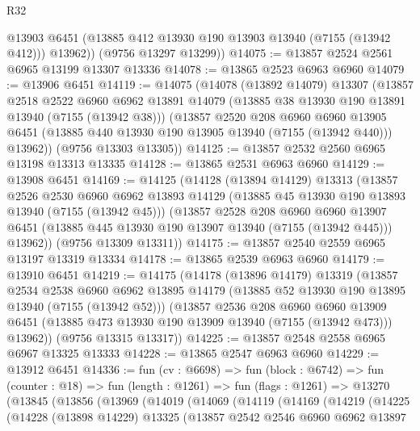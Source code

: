 \begin{lexlean}{R32}
\begin{coremodule}
          @13903
          @6451
          (@13885 @412 @13930 @190 @13903 @13940 (@7155 (@13942 @412)))
          @13962))
      (@9756 @13297 @13299))
@14075 := @13857 @2524 @2561 @6965 @13199 @13307 @13336
@14078 := @13865 @2523 @6963 @6960
@14079 := @13906 @6451
@14119 := @14075
    (@14078
      (@13892 @14079)
      @13307
      (@13857
        @2518
        @2522
        @6960
        @6962
        @13891
        @14079
        (@13885 @38 @13930 @190 @13891 @13940 (@7155 (@13942 @38)))
        (@13857
          @2520
          @208
          @6960
          @6960
          @13905
          @6451
          (@13885 @440 @13930 @190 @13905 @13940 (@7155 (@13942 @440)))
          @13962))
      (@9756 @13303 @13305))
@14125 := @13857 @2532 @2560 @6965 @13198 @13313 @13335
@14128 := @13865 @2531 @6963 @6960
@14129 := @13908 @6451
@14169 := @14125
    (@14128
      (@13894 @14129)
      @13313
      (@13857
        @2526
        @2530
        @6960
        @6962
        @13893
        @14129
        (@13885 @45 @13930 @190 @13893 @13940 (@7155 (@13942 @45)))
        (@13857
          @2528
          @208
          @6960
          @6960
          @13907
          @6451
          (@13885 @445 @13930 @190 @13907 @13940 (@7155 (@13942 @445)))
          @13962))
      (@9756 @13309 @13311))
@14175 := @13857 @2540 @2559 @6965 @13197 @13319 @13334
@14178 := @13865 @2539 @6963 @6960
@14179 := @13910 @6451
@14219 := @14175
    (@14178
      (@13896 @14179)
      @13319
      (@13857
        @2534
        @2538
        @6960
        @6962
        @13895
        @14179
        (@13885 @52 @13930 @190 @13895 @13940 (@7155 (@13942 @52)))
        (@13857
          @2536
          @208
          @6960
          @6960
          @13909
          @6451
          (@13885 @473 @13930 @190 @13909 @13940 (@7155 (@13942 @473)))
          @13962))
      (@9756 @13315 @13317))
@14225 := @13857 @2548 @2558 @6965 @6967 @13325 @13333
@14228 := @13865 @2547 @6963 @6960
@14229 := @13912 @6451
@14336 := fun (cv : @6698) =>
  fun (block : @6742) =>
  fun (counter : @18) =>
  fun (length : @1261) =>
  fun (flags : @1261) =>
  @13270
    (@13845
      (@13856
        (@13969
          (@14019
            (@14069
              (@14119
                (@14169
                  (@14219
                    (@14225
                      (@14228
                        (@13898 @14229)
                        @13325
                        (@13857
                          @2542
                          @2546
                          @6960
                          @6962
                          @13897

\end{coremodule}
\end{lexlean}
